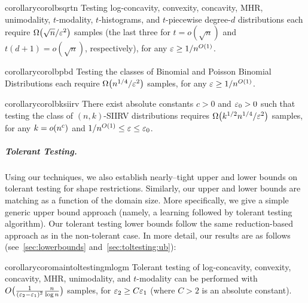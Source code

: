 \begin{restatable}{corollary}{corolbsqrtn}\label{coro:lb:sqrtn}
  Testing log-concavity, convexity, concavity, MHR, unimodality, $t$-modality, $t$-histograms, and $t$-piecewise degree-$d$ distributions each require $\bigOmega{{\sqrt{n}}/{\eps^2}}$ samples (the last three for $t = o(\sqrt{n})$ and $t(d+1) = o(\sqrt{n})$, respectively), for any $\varepsilon\geq 1/n^{O(1)}$.
\end{restatable}

\begin{restatable}{corollary}{corolbpbd}\label{coro:lb:pbd}
  Testing the classes of Binomial and Poisson Binomial Distributions each require $\bigOmega{{n^{1/4}}/{\eps^2}}$ samples, for any $\varepsilon\geq 1/n^{O(1)}$.
\end{restatable}

\begin{restatable}{corollary}{corolbksiirv}\label{coro:lb:ksiirv}
  There exist absolute constants $c>0$ and $\varepsilon_0 > 0$ such that testing the class of $(n,k)$-SIIRV distributions requires $\Omega\big( k^{1/2}n^{1/4}/\varepsilon^2 \big)$ samples, for any $k=\littleO{n^c}$ and ${1}/{n^{O(1)}} \leq \varepsilon \leq \varepsilon_0$.
\end{restatable}

\subparagraph{Tolerant Testing.} 
Using our techniques, we also establish nearly--tight upper and lower bounds on tolerant testing for shape restrictions. 
Similarly, our upper and lower bounds are matching as a function of the domain size.
More specifically, we give a simple generic upper bound approach (namely, a learning followed by tolerant testing algorithm).
Our tolerant testing lower bounds follow the same reduction-based approach as in the non-tolerant case. 
In more detail, our results are as follows (see~\cref{sec:lowerbounds} and~\cref{sec:toltesting:ub}):

\begin{restatable}{corollary}{coromaintoltestingmlogm}\label{coro:main:tol:testing:mlogm}
Tolerant testing of log-concavity, convexity, concavity, MHR, unimodality, and $t$-modality can be performed with $O\big( \frac{1}{(\varepsilon_2-\varepsilon_1)^2}\frac{n}{\log n} \big)$ samples, for $\varepsilon_2 \geq C \varepsilon_1$ (where $C>2$ is an absolute constant).
\end{restatable}


